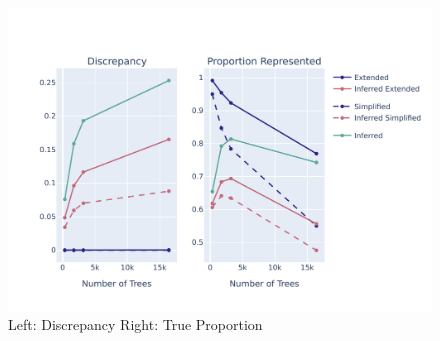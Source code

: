 \documentclass[10pt,twoside,lineno]{gsajnl}
\begin{document}
\begin{figure}
	\begin{center}
		\includegraphics[width=0.9\linewidth]{newplots_wo_ee/discrepancy_over_seqlen_1000s_new_5e7.pdf}
		\caption{Left: Discrepancy \newline Right: True Proportion}
	\end{center}
	\label{fig:discrepancy-over-seqlen}
\end{figure}
\end{document}
